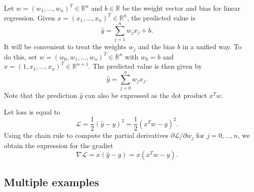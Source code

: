 \documentclass[12pt]{article}
\newcommand{\R}{\mathbb{R}}
\begin{document}
Let $w=(w_1,\ldots,w_n)^T\in\R^n$ and $b\in \R$ be the weight vector and bias for linear regression. Given $x=(x_1,\ldots,x_n)^T\in\R^n$, the predicted value is
\begin{equation}
\hat{y}=\sum_{j=1}^n w_j x_j + b.
\end{equation}
It will be convenient to treat the weights $w_j$ and the bias $b$ in a unified way.  To do this, set $w=(w_0,w_1,\ldots,w_n)^T\in\R^n$  with $w_0=b$ and $x=(1,x_1,\ldots,x_n)^T\in\R^{n+1}$. The predicted value is then given by
\begin{equation}
\hat{y}=\sum_{j=0}^n w_j x_j.
\end{equation}
Note that the prediction $\hat{y}$ can also be expressed as the dot product  $x^T w$.

Let loss is equal to 
\begin{equation}
\mathcal{L}=\frac{1}{2}(\hat{y}-y)^2 = \frac{1}{2}(x^T w - y)^2.
\end{equation}
Using the chain rule to compute the partial derivatives $\partial \mathcal{L} / \partial w_j$ for $j=0,\ldots,n$, we obtain the expression for the gradiet
\begin{equation}
\nabla\mathcal{L} = x (\hat{y}-y) = x (x^T w - y).
\end{equation}

\subsection{Multiple examples}
\end{document}
